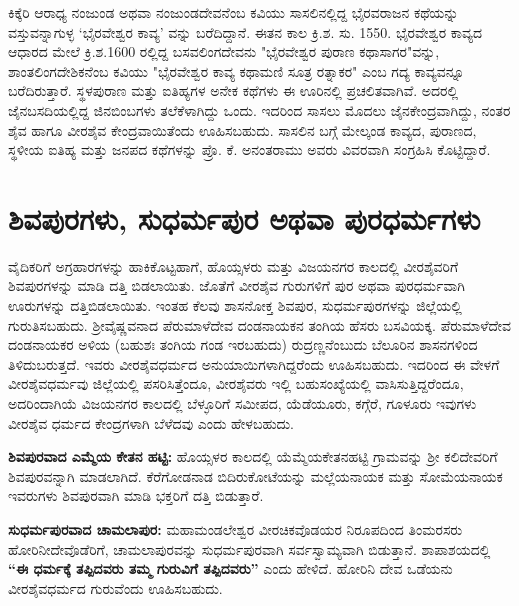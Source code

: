 ಕಿಕ್ಕೆರಿ ಆರಾಧ್ಯ ನಂಜುಂಡ ಅಥವಾ ನಂಜುಂಡದೇವನೆಂಬ ಕವಿಯು ಸಾಸಲಿನಲ್ಲಿದ್ದ ಭೈರವರಾಜನ ಕಥೆಯನ್ನು ವಸ್ತುವನ್ನಾಗುಳ್ಳ ‘ಭೈರವೇಶ್ವರ ಕಾವ್ಯ’ ವನ್ನು ಬರೆದಿದ್ದಾನೆ. ಈತನ ಕಾಲ ಕ್ರಿ.ಶ. ಸು. 1550. ಭೈರವೇಶ್ವರ ಕಾವ್ಯದ ಆಧಾರದ ಮೇಲೆ ಕ್ರಿ.ಶ.1600 ರಲ್ಲಿದ್ದ ಬಸವಲಿಂಗದೇವನು "ಭೈರವೇಶ್ವರ ಪುರಾಣ ಕಥಾಸಾಗರ"ವನ್ನು, ಶಾಂತಲಿಂಗದೇಶಿಕನೆಂಬ ಕವಿಯು "ಭೈರವೇಶ್ವರ ಕಾವ್ಯ ಕಥಾಮಣಿ ಸೂತ್ರ ರತ್ನಾಕರ" ಎಂಬ ಗದ್ಯ ಕಾವ್ಯವನ್ನೂ ಬರೆದಿರುತ್ತಾರೆ. ಸ್ಥಳಪುರಾಣ ಮತ್ತು ಐತಿಹ್ಯಗಳ ಅನೇಕ ಕಥೆಗಳು ಈ ಊರಿನಲ್ಲಿ ಪ್ರಚಲಿತವಾಗಿವೆ. ಅದರಲ್ಲಿ ಜೈನಬಸದಿಯಲ್ಲಿದ್ದ ಜಿನಬಿಂಬಗಳು ತಲೆಕೆಳಾಗಿದ್ದು ಒಂದು. ಇದರಿಂದ ಸಾಸಲು ಮೊದಲು ಜೈನಕೇಂದ್ರವಾಗಿದ್ದು, ನಂತರ ಶೈವ ಹಾಗೂ ವೀರಶೈವ ಕೇಂದ್ರವಾಯಿತೆಂದು ಊಹಿಸಬಹುದು. ಸಾಸಲಿನ ಬಗ್ಗೆ ಮೇಲ್ಕಂಡ ಕಾವ್ಯದ, ಪುರಾಣದ, ಸ್ಥಳೀಯ ಐತಿಹ್ಯ ಮತ್ತು ಜನಪದ ಕಥೆಗಳನ್ನು ಪ್ರೊ. ಕೆ. ಅನಂತರಾಮು ಅವರು ವಿವರವಾಗಿ ಸಂಗ್ರಹಿಸಿ ಕೊಟ್ಟಿದ್ದಾರೆ.

\section*{ಶಿವಪುರಗಳು, ಸುಧರ್ಮಪುರ ಅಥವಾ ಪುರಧರ್ಮಗಳು}

ವೈದಿಕರಿಗೆ ಅಗ್ರಹಾರಗಳನ್ನು ಹಾಕಿಕೊಟ್ಟಹಾಗೆ, ಹೊಯ್ಸಳರು ಮತ್ತು ವಿಜಯನಗರ ಕಾಲದಲ್ಲಿ ವೀರಶೈವರಿಗೆ ಶಿವಪುರಗಳನ್ನು ಮಾಡಿ ದತ್ತಿ ಬಿಡಲಾಯಿತು. ಜೊತೆಗೆ ವೀರಶೈವ ಗುರುಗಳಿಗೆ ಪುರ ಅಥವಾ ಪುರಧರ್ಮವಾಗಿ ಊರುಗಳನ್ನು ದತ್ತಿಬಿಡಲಾಯಿತು. ಇಂತಹ ಕೆಲವು ಶಾಸನೋಕ್ತ ಶಿವಪುರ, ಸುಧರ್ಮಪುರಗಳನ್ನು ಜಿಲ್ಲೆಯಲ್ಲಿ ಗುರುತಿಸಬಹುದು. ಶ‍್ರೀವೈಷ್ಣವನಾದ ಪೆರುಮಾಳೆದೇವ ದಂಡನಾಯಕನ ತಂಗಿಯ ಹೆಸರು ಬಸವಿಯಕ್ಕ. ಪೆರುಮಾಳೆದೇವ ದಂಡನಾಯಕರ ಅಳಿಯ (ಬಹುಶಃ ತಂಗಿಯ ಗಂಡ ಇರಬಹುದು) ರುದ್ರಣ್ಣನೆಂಬುದು ಬೆಲೂರಿನ ಶಾಸನಗಳಿಂದ ತಿಳಿದುಬರುತ್ತದೆ. ಇವರು ವೀರಶೈವಧರ್ಮದ ಅನುಯಾಯಿಗಳಾಗಿದ್ದರೆಂದು ಊಹಿಸಬಹುದು. ಇದರಿಂದ ಈ ವೇಳಗೆ ವೀರಶೈವಧರ್ಮವು ಜಿಲ್ಲೆಯಲ್ಲಿ ಪಸರಿಸಿತ್ತೆಂದೂ, ವೀರಶೈವರು ಇಲ್ಲಿ ಬಹುಸಂಖ್ಯೆಯಲ್ಲಿ ವಾಸಿಸುತ್ತಿದ್ದರೆಂದೂ, ಅದರಿಂದಾಗಿಯೆ ವಿಜಯನಗರ ಕಾಲದಲ್ಲಿ ಬೆಳ್ಳೂರಿಗೆ ಸಮೀಪದ, ಯೆಡೆಯೂರು, ಕಗ್ಗೆರೆ, ಗೂಳೂರು ಇವುಗಳು ವೀರಶೈವ ಧರ್ಮದ \-ಕೇಂದ್ರಗಳಾಗಿ ಬೆಳೆದವು ಎಂದು ಹೇಳಬಹುದು.

\textbf{ಶಿವಪುರವಾದ ಎಮ್ಮೆಯ ಕೇತನ ಹಟ್ಟಿ:} ಹೊಯ್ಸಳರ ಕಾಲದಲ್ಲಿ ಯೆಮ್ಮೆಯಕೇತನಹಟ್ಟಿ ಗ್ರಾಮವನ್ನು ಶ‍್ರೀ ಕಲಿದೇವರಿಗೆ ಶಿವಪುರವನ್ನಾಗಿ ಮಾಡಲಾಗಿದೆ. ಕೆರೆಗೋಡನಾಡ ಬಿದಿರುಕೋಟೆಯನ್ನು ಮಲ್ಲೆಯನಾಯಕ ಮತ್ತು ಸೋಮೆಯನಾಯಕ ಇವರುಗಳು ಶಿವಪುರವಾಗಿ ಮಾಡಿ ಭಕ್ತರಿಗೆ ದತ್ತಿ ಬಿಡುತ್ತಾರೆ.

\textbf{ಸುಧರ್ಮಪುರವಾದ ಚಾಮಲಾಪುರ:} ಮಹಾಮಂಡಲೇಶ್ವರ ವೀರಚಿಕವೊಡಯರ ನಿರೂಪದಿಂದ ತಿಂಮರಸರು ಹೋರಿನೀದೇವೊಡೆರಿಗೆ, ಚಾಮಲಾಪುರವನ್ನು ಸುಧರ್ಮಪುರವಾಗಿ ಸರ್ವಸ್ವಾಮ್ಯವಾಗಿ ಬಿಡುತ್ತಾನೆ. ಶಾಪಾಶಯದಲ್ಲಿ \textbf{“ಈ ಧರ್ಮಕ್ಕೆ ತಪ್ಪಿದವರು ತಮ್ಮ ಗುರುವಿಗೆ ತಪ್ಪಿದವರು”} ಎಂದು ಹೇಳಿದೆ. ಹೋರಿನಿ ದೇವ ಒಡೆಯನು ವೀರಶೈವಧರ್ಮದ ಗುರುವೆಂದು ಊಹಿಸಬಹುದು.

